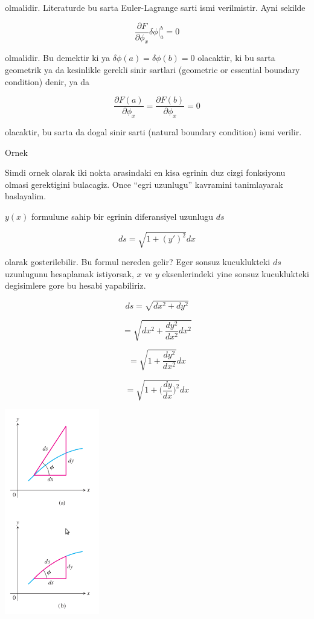 \documentclass[12pt,fleqn]{article}
\begin{document}
olmalidir. Literaturde bu sarta Euler-Lagrange sarti ismi verilmistir. Ayni
sekilde 

\[ \frac{\partial F}{\partial \phi_x} \delta \phi \bigg|_a^b = 0 \]

olmalidir. Bu demektir ki ya $\delta \phi(a) = \delta \phi(b) = 0$ olacaktir, ki
bu sarta geometrik ya da kesinlikle gerekli sinir sartlari (geometric or
essential boundary condition) denir, ya da

\[ \frac{\partial F(a)}{\partial \phi_x} = \frac{\partial F(b)}{\partial \phi_x} = 0 \]

olacaktir, bu sarta da dogal sinir sarti (natural boundary condition) ismi
verilir. 

Ornek

Simdi ornek olarak iki nokta arasindaki en kisa egrinin duz cizgi fonksiyonu
olmasi gerektigini bulacagiz. Once ``egri uzunlugu'' kavramini tanimlayarak
baslayalim. 

$y(x)$ formulune sahip bir egrinin diferansiyel uzunlugu $ds$

\[ ds = \sqrt{1 + (y')^2} dx \]

olarak gosterilebilir. Bu formul nereden gelir? Eger sonsuz kucuklukteki $ds$
uzunlugunu hesaplamak istiyorsak, $x$ ve $y$ eksenlerindeki yine sonsuz
kucuklukteki degisimlere gore bu hesabi yapabiliriz. 

\[ ds = \sqrt{dx^2 + dy^2}  \]

\[ = \sqrt{dx^2 + \frac{dy^2}{dx^2}dx^2} \]

\[ = \sqrt{1 + \frac{dy^2}{dx^2}}dx  \]

\[ = \sqrt{1 + \bigg( \frac{dy}{dx} \bigg)^2 }dx  \]

\includegraphics[height=9cm]{curve-length.png}
\end{document}
